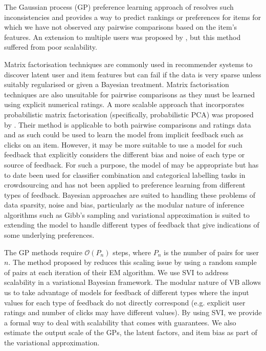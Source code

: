 The Gaussian process (GP) preference learning approach of \cite{chu2005preference} resolves such inconsistencies and provides a way to predict rankings or preferences for 
items for which we have not observed any pairwise comparisons based on the item's features. 
An extension to multiple users was proposed by \cite{houlsby2012collaborative}, 
but this method suffered from poor scalability.

Matrix factorisation techniques are commonly used in recommender systems to discover latent
user and item features but can fail if the
data is very sparse unless suitably regularised or given a Bayesian treatment.
Matrix factorisation techniques are also unsuitable for pairwise comparisons as they 
must be learned using explicit numerical ratings.
A more scalable approach that incorporates probabilistic matrix factorisation
(specifically, probabilistic PCA) was proposed by \cite{khan2014scalable}.
Their method is applicable to both pairwise comparisons and ratings data
and as such could be used to learn the model from implicit feedback such as clicks on an item. However, it may be more suitable to use a model for such feedback that explicitly considers the different bias and noise of each type or source of feedback. For such
a purpose, the model of \cite{dawid_maximum_1979} may be appropriate but has to date
been used for classifier combination and categorical labelling tasks in crowdsourcing and has not been applied to preference learning from different types of feedback. 
Bayesian approaches are suited to handling these problems of data sparsity, noise and bias, 
particularly as the modular nature of inference algorithms such as Gibb's sampling and variational approximation is suited to extending the model to handle different types of feedback that give indications of some underlying preferences. 

The GP methods require $\mathcal{O}(P_n)$ steps, where $P_n$ is the number of pairs for 
user $n$. 
The method proposed by \cite{khan2014scalable} reduces this scaling issue by using a random sample of pairs at each iteration of their EM algorithm.
We use SVI to address scalability in a variational Bayesian framework. 
The modular nature of VB allows us to take advantage of models for feedback of different types
where the input values for each type of feedback do not directly correspond (e.g. explicit user ratings and number of clicks may have different values).
By using SVI, we provide a formal way to deal with scalability that comes with guarantees\cite{hoffman2013stochastic}.
We also estimate the output scale of the GPs, the latent factors, and item bias as part of the 
variational approximation. %

